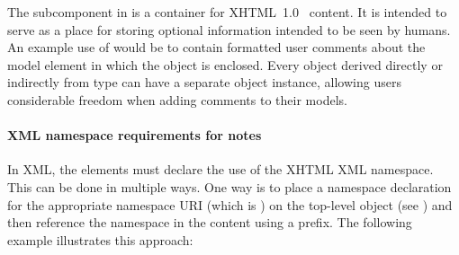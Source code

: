 The subcomponent \Notes in \SBase is a container for
XHTML~1.0~\citep{pemberton:2002} content.  It is intended to serve
as a place for storing optional information intended to be seen by
humans.  An example use of \Notes would be to contain formatted
user comments about the model element in which the \Notes object
is enclosed.  Every object derived directly or indirectly from
type \SBase can have a separate \Notes object instance, allowing
users considerable freedom when adding comments to their models.




\paragraph{XML namespace requirements for notes}

In XML, the  elements must declare the use of
the XHTML XML namespace.  This can be done in multiple ways.  One
way is to place a namespace declaration for the appropriate
namespace URI (which is ) on the
top-level \SBML object (see ) and then
reference the namespace in the  content using a
prefix.  The following example illustrates this approach:

